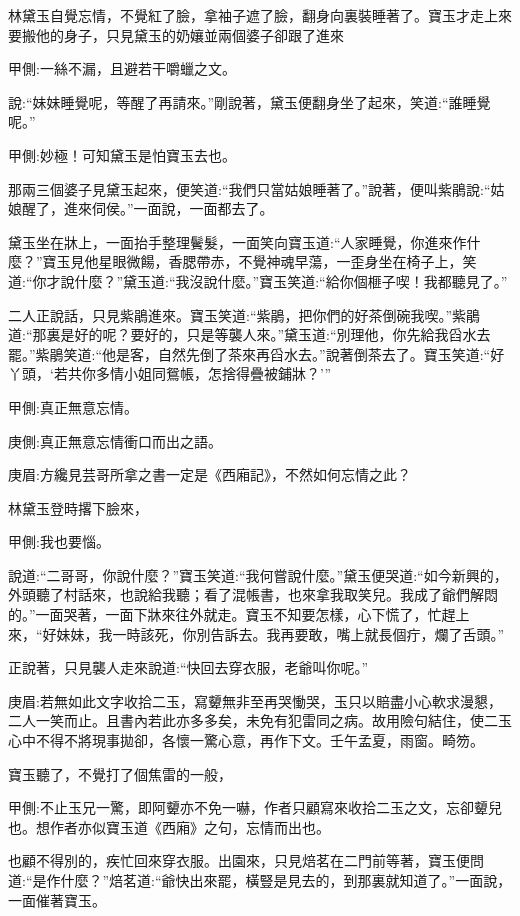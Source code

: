 \begin{parag}
    林黛玉自覺忘情，不覺紅了臉，拿袖子遮了臉，翻身向裏裝睡著了。寶玉才走上來要搬他的身子，只見黛玉的奶孃並兩個婆子卻跟了進來\begin{note}甲側:一絲不漏，且避若干嚼蠟之文。\end{note}說:“妹妹睡覺呢，等醒了再請來。”剛說著，黛玉便翻身坐了起來，笑道:“誰睡覺呢。”\begin{note}甲側:妙極！可知黛玉是怕寶玉去也。\end{note}那兩三個婆子見黛玉起來，便笑道:“我們只當姑娘睡著了。”說著，便叫紫鵑說:“姑娘醒了，進來伺侯。”一面說，一面都去了。
\end{parag}


\begin{parag}
    黛玉坐在牀上，一面抬手整理鬢髮，一面笑向寶玉道:“人家睡覺，你進來作什麼？”寶玉見他星眼微餳，香腮帶赤，不覺神魂早蕩，一歪身坐在椅子上，笑道:“你才說什麼？”黛玉道:“我沒說什麼。”寶玉笑道:“給你個榧子喫！我都聽見了。”
\end{parag}


\begin{parag}
    二人正說話，只見紫鵑進來。寶玉笑道:“紫鵑，把你們的好茶倒碗我喫。”紫鵑道:“那裏是好的呢？要好的，只是等襲人來。”黛玉道:“別理他，你先給我舀水去罷。”紫鵑笑道:“他是客，自然先倒了茶來再舀水去。”說著倒茶去了。寶玉笑道:“好丫頭，‘若共你多情小姐同鴛帳，怎捨得疊被鋪牀？’”\begin{note}甲側:真正無意忘情。\end{note}\begin{note}庚側:真正無意忘情衝口而出之語。\end{note}\begin{note}庚眉:方纔見芸哥所拿之書一定是《西廂記》，不然如何忘情之此？\end{note}林黛玉登時撂下臉來，\begin{note}甲側:我也要惱。\end{note}說道:“二哥哥，你說什麼？”寶玉笑道:“我何嘗說什麼。”黛玉便哭道:“如今新興的，外頭聽了村話來，也說給我聽；看了混帳書，也來拿我取笑兒。我成了爺們解悶的。”一面哭著，一面下牀來往外就走。寶玉不知要怎樣，心下慌了，忙趕上來，“好妹妹，我一時該死，你別告訴去。我再要敢，嘴上就長個疔，爛了舌頭。”
\end{parag}


\begin{parag}
    正說著，只見襲人走來說道:“快回去穿衣服，老爺叫你呢。”\begin{note}庚眉:若無如此文字收拾二玉，寫顰無非至再哭慟哭，玉只以賠盡小心軟求漫懇，二人一笑而止。且書內若此亦多多矣，未免有犯雷同之病。故用險句結住，使二玉心中不得不將現事拋卻，各懷一驚心意，再作下文。壬午孟夏，雨窗。畸笏。\end{note}寶玉聽了，不覺打了個焦雷的一般，\begin{note}甲側:不止玉兄一驚，即阿顰亦不免一嚇，作者只顧寫來收拾二玉之文，忘卻顰兒也。想作者亦似寶玉道《西廂》之句，忘情而出也。\end{note}也顧不得別的，疾忙回來穿衣服。出園來，只見焙茗在二門前等著，寶玉便問道:“是作什麼？”焙茗道:“爺快出來罷，橫豎是見去的，到那裏就知道了。”一面說，一面催著寶玉。
\end{parag}


